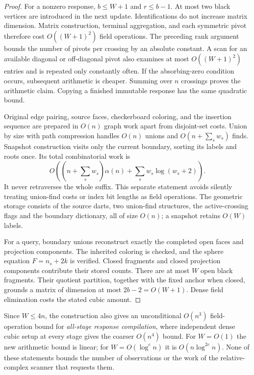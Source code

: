 \begin{proof}
For a nonzero response, $b\le W+1$ and $r\le b-1$.
At most two black vertices are introduced in the next update.
Identifications do not increase matrix dimension.  Matrix construction,
terminal aggregation, and each symmetric pivot therefore cost
$O((W+1)^2)$ field operations.  The preceding rank argument bounds
the number of pivots per crossing by an absolute constant.  A scan for
an available diagonal or off-diagonal pivot also examines at most
$O((W+1)^2)$ entries and is repeated only constantly often.  If the
absorbing-zero condition occurs, subsequent arithmetic is cheaper.
Summing over $n$ crossings proves the arithmetic claim.  Copying a
finished immutable response has the same quadratic bound.

Original edge pairing, source faces, checkerboard coloring, and the
insertion sequence are prepared in $O(n)$ graph work apart from
disjoint-set costs.  Union by size with path compression handles
$O(n)$ unions and $O(n+\sum_s w_s)$ finds.  Snapshot construction
visits only the current boundary, sorting its labels and roots once.
Its total combinatorial work is
\[
 O\!\left((n+\sum_s w_s)\alpha(n)
              +\sum_s w_s\log(w_s+2)\right).
\]
It never retraverses the whole suffix.  This separate statement avoids
silently treating union-find costs or index bit lengths as field
operations.  The geometric storage consists of the source darts,
two union-find structures, the active-crossing flags and the boundary
dictionary, all of size $O(n)$; a snapshot retains $O(W)$ labels.

For a query, boundary unions reconstruct exactly the completed open
faces and projection components.  The inherited coloring is checked,
and the sphere equation $F=n_s+2k$ is verified.  Closed fragments and
closed projection components contribute their stored counts.  There
are at most $W$ open black fragments.  Their quotient partition,
together with the fixed anchor when closed, grounds a matrix of
dimension at most $2b-2=O(W+1)$.  Dense field elimination costs the
stated cubic amount.
\end{proof}

Since $W\le 4n$, the construction also gives an unconditional
$O(n^3)$ field-operation bound for \emph{all-stage response compilation},
where independent dense cubic setup at every stage gives the coarser
$O(n^4)$ bound.  For $W=O(1)$ the new arithmetic bound is linear; for
$W=O(\log^c n)$ it is $O(n\log^{2c}n)$.  None of these statements
bounds the number of observations or the work of the relative-complex
scanner that requests them.

